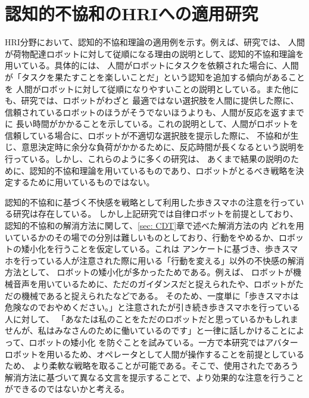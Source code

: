 \documentclass[11pt,a4j]{jreport}
\begin{document}
\section{認知的不協和のHRIへの適用研究}
HRI分野において、認知的不協和理論の適用例を示す。例えば、研究\cite{washburn2022exploring}では、
人間が荷物配達ロボットに対して従順になる理由の説明として、認知的不協和理論を用いている。具体的には、
人間がロボットにタスクを依頼された場合に、人間が「タスクを果たすことを楽しいことだ」という認知を追加する傾向があることを
人間がロボットに対して従順になりやすいことの説明としている。また他にも、研究\cite{herse2018you}では、ロボットがわざと
最適ではない選択肢を人間に提供した際に、信頼されているロボットのほうがそうでないほうよりも、人間が反応を返すまでに
長い時間がかかることを示している。これの説明として、人間がロボットを信頼している場合に、ロボットが不適切な選択肢を提示した際に、
不協和が生じ、意思決定時に余分な負荷がかかるために、反応時間が長くなるという説明を行っている。しかし、これらのように多くの研究は、
あくまで結果の説明のために、認知的不協和理論を用いているものであり、ロボットがとるべき戦略を決定するために用いているものではない。

認知的不協和に基づく不快感を戦略として利用した歩きスマホの注意を行っている研究は存在している\cite{Schneider2022}。
しかし上記研究では自律ロボットを前提としており、認知的不協和の解消方法に関して、\ref{sec: CDT}章で述べた解消方法の内
どれを用いているかのその場での分別は難しいものとしており、行動をやめるか、ロボットの矮小化を行うことを仮定している。これは
アンケートに基づき、歩きスマホを行っている人が注意された際に用いる「行動を変える」以外の不快感の解消方法として、
ロボットの矮小化が多かったためである。例えば、
ロボットが機械音声を用いているために、ただのガイダンスだと捉えられたや、ロボットがただの機械であると捉えられたなどである。
そのため、一度単に「歩きスマホは危険なのでおやめください。」と注意されたが引き続き歩きスマホを行っている人に対して、
「あなたは私のことをただのロボットだと思っているかもしれませんが、私はみなさんのために働いているのです」と一律に話しかけることによって、ロボットの矮小化
を防ぐことを試みている。一方で本研究ではアバターロボットを用いるため、オペレータとして人間が操作することを前提としているため、
より柔軟な戦略を取ることが可能である。そこで、使用されたであろう解消方法に基づいて異なる文言を提示することで、より効果的な注意を行うことができるのではないかと考える。
\end{document}
